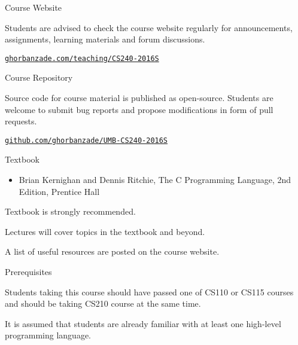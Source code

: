 \documentclass[compress]{beamer}
\begin{document}
\begin{slide}
	\begin{block}{Course Website}

	Students are advised to check the course website regularly for announcements, assignments, learning materials and forum discussions.

	\begin{center}
	\href{http://ghorbanzade.com/teaching/cs240-2016s}{\texttt{ghorbanzade.com/teaching/CS240-2016S}}
	\end{center}

	\end{block}
\end{slide}

\begin{slide}
	\begin{block}{Course Repository}

	Source code for course material is published as open-source.
	Students are welcome to submit bug reports and propose modifications in form of pull requests.

	\begin{center}
	\href{https://github.com/ghorbanzade/umb-cs240-2016s}{\texttt{github.com/ghorbanzade/UMB-CS240-2016S}}
	\end{center}

	\end{block}
\end{slide}

\begin{slide}
	\begin{block}{Textbook}

	\begin{itemize}
	\item[] Brian Kernighan and Dennis Ritchie, The C Programming Language, 2nd Edition, Prentice Hall
	\end{itemize}

	Textbook is \alert{strongly} recommended.

	Lectures will cover topics in the textbook and beyond.

	A list of useful resources are posted on the course website.

	\end{block}
\end{slide}

\begin{slide}
	\begin{block}{Prerequisites}

	Students taking this course should have passed one of CS110 or CS115 courses and should be taking CS210 course at the same time.

	It is assumed that students are already familiar with at least one high-level programming language.

	\end{block}
\end{slide}
\end{document}
